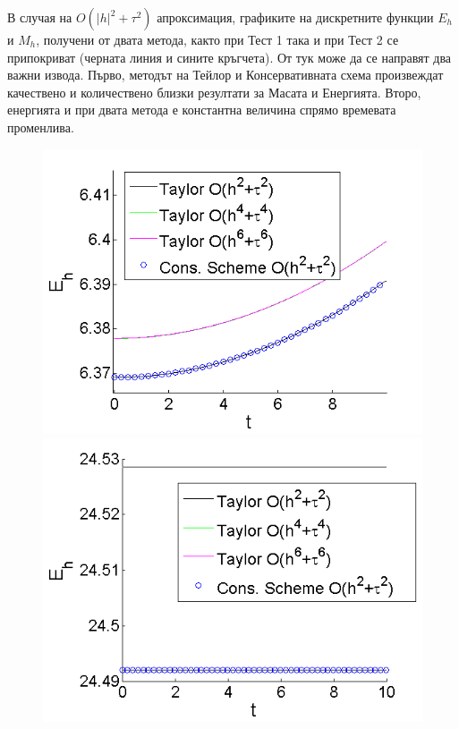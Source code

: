 \documentclass[a4paper]{article}
\theoremstyle{remark}
\begin{document}
\begin{large}
В случая на $O(|h|^2 +\tau^2)$ апроксимация, графиките на дискретните функции $E_h$ и $M_h$, получени от двата метода, както при Тест 1 така и при Тест 2 се припокриват (черната линия и сините кръгчета). От тук може да се направят два важни извода. Първо, методът на Тейлор и Консервативната схема произвеждат качествено и количествено близки резултати за Масата и Енергията. Второ, енергията и при двата метода е константна величина спрямо времевата променлива. 
\begin{figure}[ht]\vspace{0.2cm}
	\begin{minipage}[b]{0.51\linewidth}
		\includegraphics[width=\linewidth]{Mass/Mass_bt3_c045_h005_Taylor_Conservative.png}
	\end{minipage}	
	\begin{minipage}[b]{0.51\linewidth}
		\includegraphics[width=\linewidth]{Energy/Energy_bt3_c045_h005_Taylor_Conservative.png}	

\end{minipage}
\end{figure}
\end{large}
\end{document}
